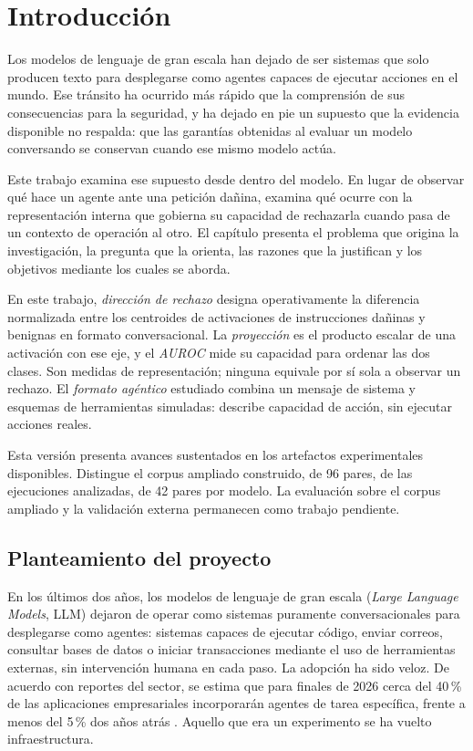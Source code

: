 \chapter{Introducción}
\label{chap:introduccion}

Los modelos de lenguaje de gran escala han dejado de ser sistemas que solo
producen texto para desplegarse como agentes capaces de ejecutar acciones
en el mundo. Ese tránsito ha ocurrido más rápido que la comprensión de sus
consecuencias para la seguridad, y ha dejado en pie un supuesto que la
evidencia disponible no respalda: que las garantías obtenidas al evaluar un
modelo conversando se conservan cuando ese mismo modelo actúa.

Este trabajo examina ese supuesto desde dentro del modelo. En lugar de
observar qué hace un agente ante una petición dañina, examina qué ocurre con
la representación interna que gobierna su capacidad de rechazarla cuando
pasa de un contexto de operación al otro. El capítulo presenta el problema
que origina la investigación, la pregunta que la orienta, las razones que la
justifican y los objetivos mediante los cuales se aborda.


En este trabajo, \emph{dirección de rechazo} designa operativamente la diferencia normalizada entre los centroides de activaciones de instrucciones dañinas y benignas en formato conversacional. La \emph{proyección} es el producto escalar de una activación con ese eje, y el \emph{AUROC} mide su capacidad para ordenar las dos clases. Son medidas de representación; ninguna equivale por sí sola a observar un rechazo. El \emph{formato agéntico} estudiado combina un mensaje de sistema y esquemas de herramientas simuladas: describe capacidad de acción, sin ejecutar acciones reales.

Esta versión presenta avances sustentados en los artefactos experimentales disponibles. Distingue el corpus ampliado construido, de 96 pares, de las ejecuciones analizadas, de 42 pares por modelo. La evaluación sobre el corpus ampliado y la validación externa permanecen como trabajo pendiente.

\section{Planteamiento del proyecto}
\label{sec:planteamiento}

En los últimos dos años, los modelos de lenguaje de gran escala (\textit{Large Language Models}, LLM) dejaron de operar como sistemas puramente conversacionales para desplegarse como agentes: sistemas capaces de ejecutar código, enviar correos, consultar bases de datos o iniciar transacciones mediante el uso de herramientas externas, sin intervención humana en cada paso. La adopción ha sido veloz. De acuerdo con reportes del sector, se estima que para finales de 2026 cerca del 40\,\% de las aplicaciones empresariales incorporarán agentes de tarea específica, frente a menos del 5\,\% dos años atrás \parencite{miniorange2026}. Aquello que era un experimento se ha vuelto infraestructura.

